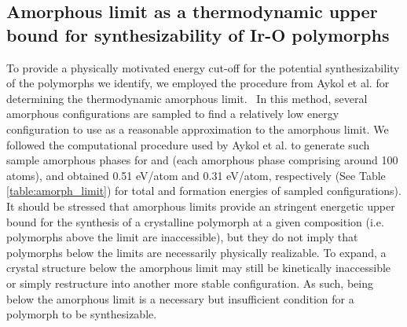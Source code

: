 %
%
%
%


\subsection{Amorphous limit as a thermodynamic upper bound for synthesizability of Ir-O polymorphs}
%

%
%
To provide a physically motivated energy cut-off for the potential synthesizability of the polymorphs we identify, we employed the procedure from Aykol et al. for determining the thermodynamic amorphous limit.~\cite{Aykol2018}
%
In this method, several amorphous configurations are sampled to find a relatively low energy configuration to use as a reasonable approximation to the amorphous limit.
%
We followed the computational procedure used by Aykol et al. to generate such sample amorphous phases for \IrOtwo and \IrOthree
(each amorphous phase comprising around 100 atoms),
and obtained 0.51 eV/atom and 0.31 eV/atom, respectively
(See Table \ref{table:amorph_limit}) for total and formation energies of sampled configurations).
%
It should be stressed that amorphous limits provide an stringent energetic upper bound for the synthesis of a crystalline polymorph at a given composition (i.e. polymorphs above the limit are inaccessible),
but they do not imply that polymorphs below the limits are necessarily physically realizable.
%
To expand, a crystal structure below the amorphous limit may still be kinetically inaccessible or simply restructure into another more stable configuration.
%
As such, being below the amorphous limit is a necessary but insufficient condition for a polymorph to be synthesizable.

